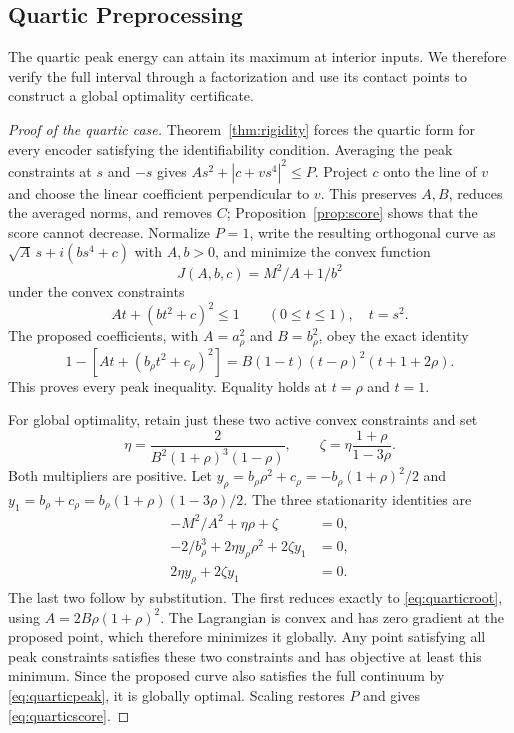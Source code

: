 \subsection{Quartic Preprocessing}

The quartic peak energy can attain its maximum at interior inputs. We therefore verify the full interval through a factorization and use its contact points to construct a global optimality certificate.

\begin{proof}[Proof of the quartic case]
Theorem~\ref{thm:rigidity} forces the quartic form for every encoder satisfying the identifiability condition. Averaging the peak constraints at $s$ and $-s$ gives $A s^2+|c+v s^4|^2\le P$. Project $c$ onto the line of $v$ and choose the linear coefficient perpendicular to $v$. This preserves $A,B$, reduces the averaged norms, and removes $C$; Proposition~\ref{prop:score} shows that the score cannot decrease. Normalize $P=1$, write the resulting orthogonal curve as $\sqrt A\,s+i(bs^4+c)$ with $A,b>0$, and minimize the convex function
$$
 J(A,b,c)=M^2/A+1/b^2
$$
under the convex constraints
$$
 A t+(bt^2+c)^2\le1\qquad(0\le t\le1),
 \quad t=s^2.
$$
The proposed coefficients, with $A=a_\rho^2$ and $B=b_\rho^2$, obey the exact identity
\begin{equation}
 1-\left[A t+(b_\rho t^2+c_\rho)^2\right]
 =B(1-t)(t-\rho)^2(t+1+2\rho).
 \label{eq:quarticpeak}
\end{equation}
This proves every peak inequality. Equality holds at $t=\rho$ and $t=1$.

For global optimality, retain just these two active convex constraints and set
$$
 \eta=\frac{2}{B^2(1+\rho)^3(1-\rho)},\qquad
 \zeta=\eta\frac{1+\rho}{1-3\rho}.
$$
Both multipliers are positive. Let $y_\rho=b_\rho\rho^2+c_\rho=-b_\rho(1+\rho)^2/2$ and $y_1=b_\rho+c_\rho=b_\rho(1+\rho)(1-3\rho)/2$. The three stationarity identities are
\begin{equation}
\begin{aligned}
 -M^2/A^2+\eta\rho+\zeta&=0,\\
 -2/b_\rho^3+2\eta y_\rho\rho^2+2\zeta y_1&=0,\\
 2\eta y_\rho+2\zeta y_1&=0.
\end{aligned}
\label{eq:kkt}
\end{equation}
The last two follow by substitution. The first reduces exactly to \eqref{eq:quarticroot}, using $A=2B\rho(1+\rho)^2$. The Lagrangian is convex and has zero gradient at the proposed point, which therefore minimizes it globally. Any point satisfying all peak constraints satisfies these two constraints and has objective at least this minimum. Since the proposed curve also satisfies the full continuum by \eqref{eq:quarticpeak}, it is globally optimal. Scaling restores $P$ and gives \eqref{eq:quarticscore}.
\end{proof}

